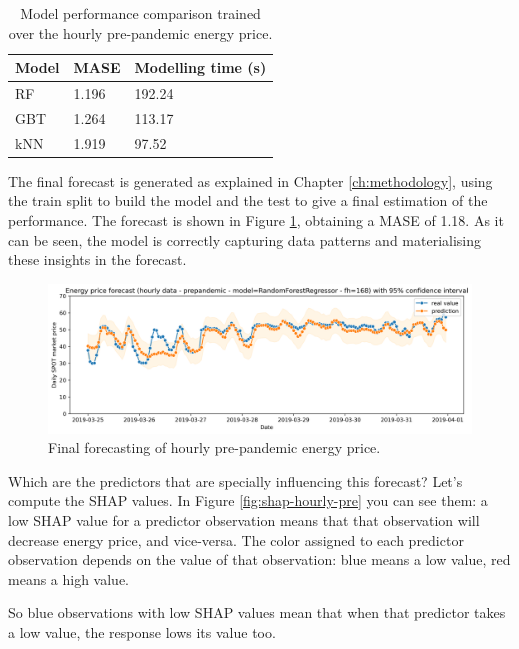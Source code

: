 \begin{table}[H]
\centering
\begin{tabular}{@{}l|l|l@{}}
\toprule
Model & MASE  & Modelling time (s)  \\ \midrule
RF    & 1.196 & 192.24              \\
GBT   & 1.264 & 113.17              \\
kNN   & 1.919 & 97.52               \\ \bottomrule
\end{tabular}
\caption{Model performance comparison trained over the hourly pre-pandemic energy price.}
\label{tab:cv-hourly-prep}
\end{table}

The final forecast is generated as explained in Chapter \ref{ch:methodology}, using the train split to build the model and the test to give a final estimation of the performance. The forecast is shown in Figure \ref{fig:forecast-hourly-pre}, obtaining a MASE of 1.18. As it can be seen, the model is correctly capturing data patterns and materialising these insights in the forecast.

\begin{figure}[H]
\centering
    \caption{Final forecasting of hourly pre-pandemic energy price.}
    \label{fig:forecast-hourly-pre}
    \includegraphics[scale=0.4]{images/analysis/forecast-hourly-pre}
\end{figure}

Which are the predictors that are specially influencing this forecast? Let's compute the SHAP values. In Figure \ref{fig:shap-hourly-pre} you can see them: a low SHAP value for a predictor observation means that that observation will decrease energy price, and vice-versa. The color assigned to each predictor observation depends on the value of that observation: blue means a low value, red means a high value.

So blue observations with low SHAP values mean that when that predictor takes a low value, the response lows its value too.

